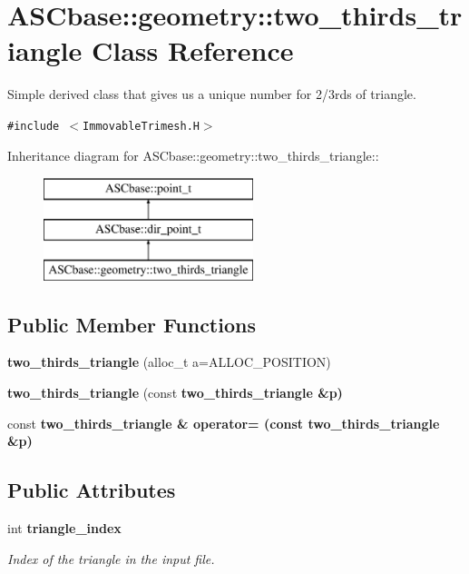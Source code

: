\section{ASCbase::geometry::two\_\-thirds\_\-triangle Class Reference}
\label{classASCbase_1_1geometry_1_1two__thirds__triangle}
Simple derived class that gives us a unique number for 2/3rds of triangle.  


{\tt \#include $<$Immovable\-Trimesh.H$>$}

Inheritance diagram for ASCbase::geometry::two\_\-thirds\_\-triangle::\begin{figure}[H]
\begin{center}
\leavevmode
\includegraphics[height=3cm]{classASCbase_1_1geometry_1_1two__thirds__triangle}
\end{center}
\end{figure}
\subsection*{Public Member Functions}
\begin{CompactItemize}
\item 
\textbf{two\_\-thirds\_\-triangle} (alloc\_\-t a=ALLOC\_\-POSITION)\label{classASCbase_1_1geometry_1_1two__thirds__triangle_c5b749d578f384ebb2f2ebf06b136dad}

\item 
\textbf{two\_\-thirds\_\-triangle} (const \bf{two\_\-thirds\_\-triangle} \&p)\label{classASCbase_1_1geometry_1_1two__thirds__triangle_61c17246665ba11761bd28a36450b746}

\item 
const \bf{two\_\-thirds\_\-triangle} \& \textbf{operator=} (const \bf{two\_\-thirds\_\-triangle} \&p)\label{classASCbase_1_1geometry_1_1two__thirds__triangle_e4ddddeffcae8e96e30cbe475fc04265}

\end{CompactItemize}
\subsection*{Public Attributes}
\begin{CompactItemize}
\item 
int \bf{triangle\_\-index}\label{classASCbase_1_1geometry_1_1two__thirds__triangle_0f34a791ed7ba9f1e116a12da68b1bff}

\begin{CompactList}\small\item\em Index of the triangle in the input file. \item\end{CompactList}\end{CompactItemize}

